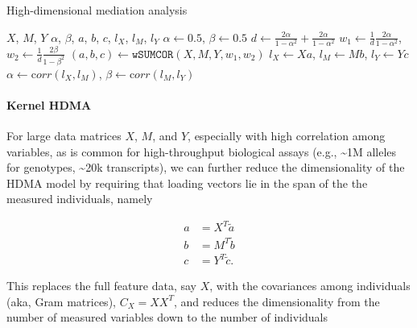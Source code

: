\documentclass[
]{article}
\begin{document}
\begin{algorithm}
\caption{High-dimensional mediation analysis}\label{alg:hdma}
\begin{algorithmic}
\Require $X$, $M$, $Y$ 
\Ensure $\alpha$, $\beta$, $a$, $b$, $c$, $l_X$, $l_M$, $l_Y$ 
\State $\alpha \gets 0.5$, $\beta \gets 0.5$ 
\State $d \gets \frac{2\alpha}{1-\alpha^2} + \frac{2\alpha}{1-\alpha^2}$ 
\State $w_1 \gets \frac{1}{d}\frac{2\alpha}{1-\alpha^2}$, $w_2 \gets \frac{1}{d}\frac{2\beta}{1-\beta^2}$ 
\State $(a,b,c) \gets \texttt{wSUMCOR}(X, M, Y, w_1, w_2)$  
\State $l_X \gets Xa$, $l_M \gets Mb$, $l_Y \gets Yc$ 
\State $\alpha \gets {\mathrm corr}(l_X, l_M)$, $\beta \gets {\mathrm corr}(l_M, l_Y)$ 
\EndWhile
\end{algorithmic}
\end{algorithm}

\paragraph{Kernel HDMA}\label{kernel-hdma}

For large data matrices \(X\), \(M\), and \(Y\), especially with high
correlation among variables, as is common for high-throughput biological
assays (e.g., \textasciitilde1M alleles for genotypes,
\textasciitilde20k transcripts), we can further reduce the
dimensionality of the HDMA model by requiring that loading vectors lie
in the span of the the measured individuals, namely

\begin{align}
a &= X^T \tilde{a} \\
b &= M^T \tilde{b} \\
c &= Y^T \tilde{c}.
\end{align}

This replaces the full feature data, say \(X\), with the covariances
among individuals (aka, Gram matrices), \(C_X = XX^T\), and reduces the
dimensionality from the number of measured variables down to the number
of individuals
\end{document}
